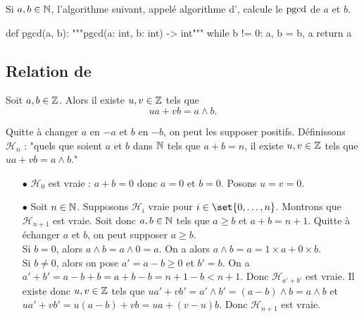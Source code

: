\documentclass{magnolia}
\begin{document}
\begin{remarqueUnique}
\remarque Si $a,b\in\mathbb{N}$, l'algorithme suivant, appelé algorithme d', calcule le $\operatorname{pgcd}$ de $a$ et $b$.
\begin{pythoncode}
def pgcd(a, b):
    """pgcd(a: int, b: int) -> int"""
    while b != 0:
        a, b = b, a %
    return a
\end{pythoncode}
\end{remarqueUnique}

\subsection{Relation de }

\begin{proposition}
Soit $a,b\in\mathbb{Z}$. Alors il existe $u,v\in\mathbb{Z}$ tels que
\[ua+vb=a\wedge b.\]
\end{proposition}

\begin{preuve}
Quitte à changer $a$ en $-a$ et $b$ en $-b$, on peut les supposer positifs. Définissons $\mathcal{H}_n$ : "quels que soient $a$ et $b$ dans $\mathbb{N}$ tels que $a+b=n$, il existe $u,v\in \mathbb{Z}$ tels que $ua+vb=a\wedge b$."
\begin{itemize}
\item[$\bullet$] $\mathcal{H}_0$ est vraie : $a+b=0$ donc $a=0$ et $b=0$. Posons $u=v=0$.
\item[$\bullet$] Soit $n\in \mathbb{N}$. Supposons $\mathcal{H}_i$ vraie pour $i\in \set{0,\ldots,n}$. Montrons que $\mathcal{H}_{n+1}$ est vraie. Soit donc $a,b\in \mathbb{N}$ tels que $a\geq b$ et $a+b=n+1$. Quitte à échanger $a$ et $b$, on peut supposer $a\geq b$.\\
Si $b=0$, alors $a\wedge b=a\wedge 0=a$. On a alors $a\wedge b=a=1\times a+0\times b$.\\
Si $b\neq 0$, alors on pose $a'=a-b\geq 0$ et $b'=b$. On a $a'+b'=a-b+b=a+b-b=n+1-b<n+1$. Donc  $\mathcal{H}_{a'+b'}$ est vraie. Il existe donc $u,v\in \mathbb{Z}$ tels que $ua'+vb'=a'\wedge b'=(a-b)\wedge b=a\wedge b$ et $ua'+vb'=u(a-b)+vb=ua+(v-u)b$. Donc $\mathcal{H}_{n+1}$ est vraie.
\end{itemize}
\end{preuve}
\end{document}
